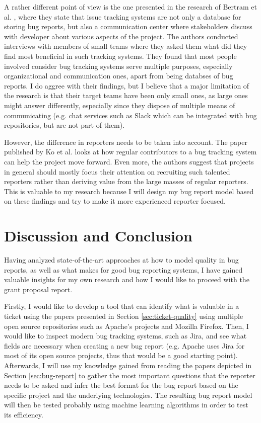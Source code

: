 \documentclass[11pt,english,twocolumn]{article}
\begin{document}
A rather different point of view is the one presented in the research
of Bertram et al. \cite{bertram2010communication}, where they state that
issue tracking systems are not only a database for storing bug reports,
but also a communication center where stakeholders discuss with developer
about various aspects of the project. The authors conducted interviews with
members of small teams where they asked them what did they find most beneficial
in such tracking systems. They found that most people involved consider
bug tracking systems serve multiple purposes, especially organizational and
communication ones, apart from being databses of bug reports. I do aggree 
with their findings, but I believe that a major limitation of the research
is that their target teams have been only small ones, as large ones might
answer differently, especially since they dispose of multiple means of 
communicating (e.g. chat services such as Slack which can be integrated 
with bug repositories, but are not part of them).

However, the difference in reporters needs to be taken into account. The 
paper published by Ko et al. \cite{ko2010power} looks at how regular 
contributors to a bug tracking system can help the project move forward. 
Even more, the authors suggest that projects in general should mostly 
focus their attention on recruiting such talented reporters rather than
deriving value from the large masses of regular reporters. This is valuable
to my research because I will design my bug report model based on 
these findings and try to make it more experienced reporter focused.

\section{Discussion and Conclusion}
\label{sec:conclusion}

Having analyzed state-of-the-art approaches at how to model quality in bug reports,
as well as what makes for good bug reporting systems, I have gained valuable
insights for my own research and how I would like to proceed with the grant 
proposal report.

Firstly, I would like to develop a tool that can identify what is valuable in a 
ticket using the papers presented in Section \ref{sec:ticket-quality} using multiple
open source repositories such as Apache's projects and Mozilla Firefox. Then, 
I would like to inspect modern bug tracking systems, such as Jira, and see what fields
are necessary when creating a new bug report (e.g. Apache uses Jira for most of its
open source projects, thus that would be a good starting point). Afterwards, 
I will use my knowledge gained from reading the papers depicted in 
Section \ref{sec:bug-report} to gather the most important questions that the reporter
needs to be asked and infer the best format for the bug report based on the specific
project and the underlying technologies. The resulting bug report model will then be
tested probably using machine learning algorithms in order to test its efficiency.
\end{document}

